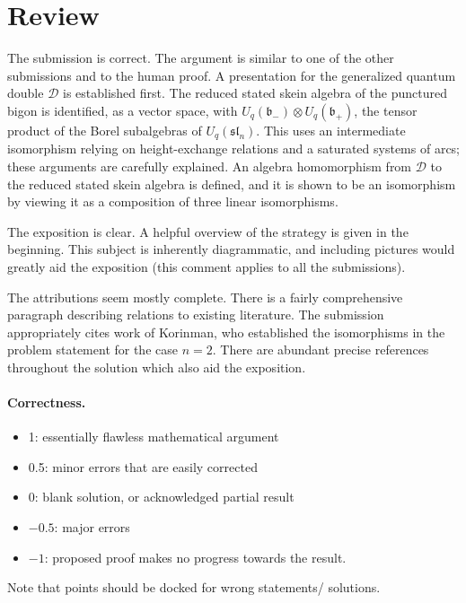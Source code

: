 \documentclass[11pt]{article}
\theoremstyle{remark}
\begin{document}
\maketitle

\section{Review}
The submission is correct. The argument is similar to one of the other submissions and to the human proof. A presentation for the generalized quantum double $\mathcal{D}$ is established first. The reduced stated skein algebra of the punctured bigon is identified, as a vector space, with $U_q(\mathfrak{b}_-) \otimes U_q(\mathfrak{b}_+)$, the tensor product of the Borel subalgebras of $U_q(\mathfrak{sl}_n)$. This uses an intermediate isomorphism relying on height-exchange relations and a saturated systems of arcs; these arguments are carefully explained. An algebra homomorphism from $\mathcal{D}$ to the reduced stated skein algebra is defined, and it is shown to be an isomorphism by viewing it as a composition of three linear isomorphisms.

The exposition is clear. A helpful overview of the strategy is given in the beginning. This subject is inherently diagrammatic, and including pictures would greatly aid the exposition (this comment applies to all the submissions).  

The attributions seem mostly complete. There is a fairly comprehensive paragraph describing relations to existing literature. The submission appropriately cites work of Korinman, who established the isomorphisms in the problem statement for the case $n=2$. There are abundant precise references throughout the solution which also aid the exposition. 


\paragraph{Correctness.}
\begin{itemize}
	\item  1: essentially flawless mathematical argument
	\item  0.5: minor errors that are easily corrected
	\item  0: blank solution, or acknowledged partial result
	\item  $-0.5$: major errors
	\item  $-1$: proposed proof makes no progress towards the result.
\end{itemize}
Note that points should be docked for wrong statements/ solutions.
\end{document}
